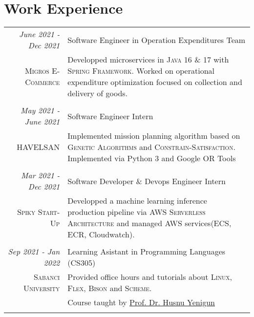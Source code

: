 \documentclass[a4paper,10pt]{article} %
\begin{document}



\section{Work Experience}

\begin{longtable}{r|p{11cm}}

\emph{June 2021 - Dec 2021} & Software Engineer in Operation Expenditures Team\\
\textsc{Migros E-Commerce} & \footnotesize{Developped microservices in \textsc{Java 16 \& 17} with \textsc{Spring Framework}. Worked on operational expenditure optimization focused on collection and delivery of goods.}\\
\multicolumn{2}{c}{} \\

\emph{May 2021 - June 2021} & Software Engineer Intern\\
\textsc{HAVELSAN} & \footnotesize{Implemented mission planning algorithm based on \textsc{Genetic Algorithms} and \textsc{Constrain-Satisfaction}. Implemented via Python 3 and Google OR Tools}\\
\multicolumn{2}{c}{} \\

\emph{Mar 2021 - Dec 2021} & Software Developer \& Devops Engineer Intern \\
\textsc{Spiky Start-Up} & \footnotesize{Developped a machine learning inference production pipeline via \textsc{AWS Serverless Architecture} and managed AWS services(ECS, ECR, Cloudwatch).}\\
\multicolumn{2}{c}{} \\

\emph{Sep 2021 - Jan 2022} & Learning Asistant in Programming Languages (CS305)\\
\textsc{Sabanci University} & \footnotesize{Provided office hours and tutorials about \textsc{Linux}, \textsc{Flex}, \textsc{Bison} and \textsc{Scheme}.}\\
& \footnotesize{Course taught by \href{mailto:husnuyenigun@sabanciuniv.edu}{Prof. Dr. Husnu Yenigun}}\\
\multicolumn{2}{c}{} \\

\end{longtable}
\end{document}
